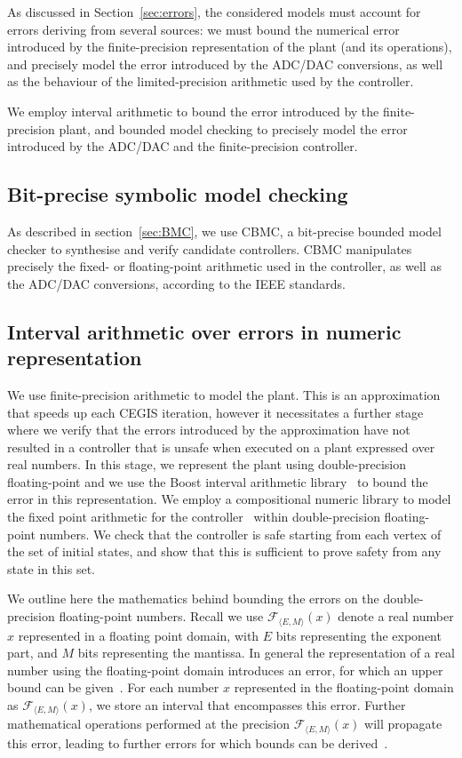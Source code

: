 \documentclass[twocolumn]{autart}    %
\begin{document}
As discussed in Section~\ref{sec:errors}, 
the considered models must account for errors deriving from several sources: 
we must bound the numerical error introduced by the finite-precision representation of the plant (and its operations), 
and precisely model the error introduced by the ADC/DAC conversions, 
as well as the behaviour of the limited-precision arithmetic used by the controller. 

We employ interval arithmetic to bound the error introduced by the finite-precision plant, 
and bounded model checking to precisely model the error introduced by the ADC/DAC and the finite-precision controller.

\subsection{Bit-precise symbolic model checking}
As described in section~\ref{sec:BMC}, we use CBMC, a bit-precise bounded model checker to synthesise and verify candidate controllers. 
CBMC manipulates precisely the fixed- or floating-point arithmetic used in the controller, 
as well as the ADC/DAC conversions, 
according to the IEEE standards. 

\subsection{Interval arithmetic over errors in numeric representation} 
We use finite-precision arithmetic to model the plant. 
This is an approximation that speeds up each CEGIS iteration, 
however it necessitates a further stage where we verify that the errors introduced by the approximation have not resulted in a controller that is unsafe when executed on a plant expressed over real numbers.  
In this stage, we represent the plant using double-precision floating-point
and we use the Boost interval arithmetic library~\cite{DBLP:journals/tcs/BronnimannMP06} to bound the error in this representation. 
We employ a compositional numeric library to model the fixed point arithmetic for the controller~\cite{CNL} within double-precision floating-point numbers. 
We check that the controller is safe starting from each vertex of the set of initial states,  
and show that this is sufficient to prove safety from any state in this set. 

We outline here the mathematics behind bounding the errors on the double-precision floating-point numbers. 
Recall we use $\mathcal{F}_{\langle E,M \rangle}(x)$ denote a real number $x$ represented in a floating point domain, 
with $E$ bits representing the exponent part, and $M$ bits representing the mantissa. 
In general the representation of a real number using the floating-point domain introduces an error, 
for which an upper bound can be given~\cite{DBLP:conf/arith/BrainTRW15}.
For each number $x$ represented in the floating-point domain as $\mathcal{F}_{\langle E,M \rangle}(x)$, 
we store an interval that encompasses this error. 
Further mathematical operations performed at the precision $\mathcal{F}_{\langle E,M \rangle}(x)$ will propagate this error, 
leading to further errors for which bounds can be derived~\cite{DBLP:conf/arith/BrainTRW15}.  
\end{document}
